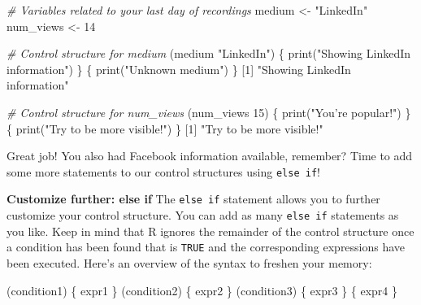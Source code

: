 \documentclass[]{article}
\newcommand{\hlnum}[1]{\textcolor[rgb]{0.816,0.125,0.439}{#1}}%
\newcommand{\hlstr}[1]{\textcolor[rgb]{0.251,0.627,0.251}{#1}}%
\newcommand{\hlcom}[1]{\textcolor[rgb]{0.502,0.502,0.502}{\textit{#1}}}%
\newcommand{\hlstd}[1]{\textcolor[rgb]{0.251,0.251,0.251}{#1}}%
\newcommand{\hlkwd}[1]{\textcolor[rgb]{0.878,0.439,0.125}{#1}}%
\newenvironment{Shaded}{\begin{myshaded}}{\end{myshaded}}
\newcommand{\KeywordTok}[1]{\hlkwd{#1}}
\newcommand{\DecValTok}[1]{\hlnum{#1}}
\newcommand{\StringTok}[1]{\hlstr{#1}}
\newcommand{\CommentTok}[1]{\hlcom{#1}}
\newcommand{\NormalTok}[1]{\hlstd{#1}}
\begin{document}
\begin{Shaded}
\begin{Highlighting}[]
\CommentTok{# Variables related to your last day of recordings}
\NormalTok{medium <-}\StringTok{ "LinkedIn"}
\NormalTok{num_views <-}\StringTok{ }\DecValTok{14}

\CommentTok{# Control structure for medium}
\NormalTok{ (medium }\OperatorTok{==}\StringTok{ "LinkedIn"}\NormalTok{) \{}
\KeywordTok{print}\NormalTok{(}\StringTok{"Showing LinkedIn information"}\NormalTok{)}
\NormalTok{\} }\NormalTok{ \{}
\KeywordTok{print}\NormalTok{(}\StringTok{"Unknown medium"}\NormalTok{)}
\NormalTok{\}}
\NormalTok{   [}\DecValTok{1}\NormalTok{] }\StringTok{"Showing LinkedIn information"}



\CommentTok{# Control structure for num_views}
\NormalTok{ (num_views }\OperatorTok{>}\StringTok{ }\DecValTok{15}\NormalTok{) \{}
\KeywordTok{print}\NormalTok{(}\StringTok{"You're popular!"}\NormalTok{)}
\NormalTok{\} }\NormalTok{ \{}
\KeywordTok{print}\NormalTok{(}\StringTok{"Try to be more visible!"}\NormalTok{)}
\NormalTok{\}}
\NormalTok{   [}\DecValTok{1}\NormalTok{] }\StringTok{"Try to be more visible!"}
\end{Highlighting}
\end{Shaded}

Great job! You also had Facebook information available, remember? Time
to add some more statements to our control structures using
\texttt{else\ if}!

\textbf{Customize further: else if} The \texttt{else\ if} statement
allows you to further customize your control structure. You can add as
many \texttt{else\ if} statements as you like. Keep in mind that R
ignores the remainder of the control structure once a condition has been
found that is \texttt{TRUE} and the corresponding expressions have been
executed. Here's an overview of the syntax to freshen your memory:

\begin{Shaded}
\begin{Highlighting}[]
\NormalTok{ (condition1) \{}
\NormalTok{expr1}
\NormalTok{\} } \NormalTok{ (condition2) \{}
\NormalTok{expr2}
\NormalTok{\} } \NormalTok{ (condition3) \{}
\NormalTok{expr3}
\NormalTok{\} }\NormalTok{ \{}
\NormalTok{expr4}
\NormalTok{\}}
\end{Highlighting}
\end{Shaded}
\end{document}

